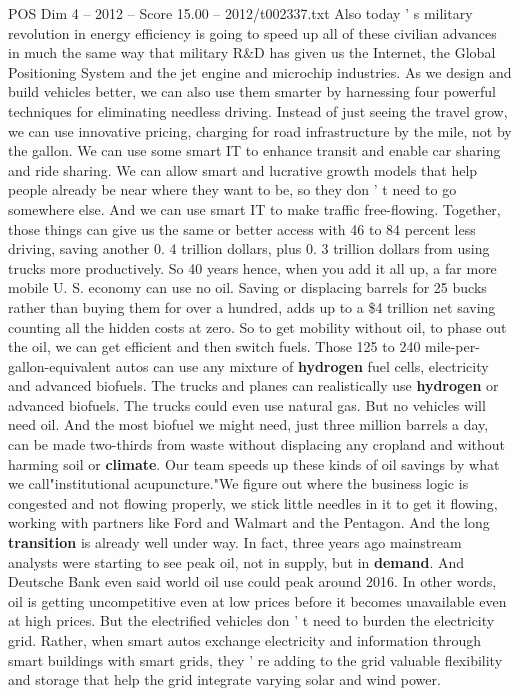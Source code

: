 \begin{textsample}{POS Dim 4 – 2012 – Score 15.00 – 2012/t002337.txt}
Also today ' s military revolution in energy efficiency is going to speed up all of these civilian advances in much the same way that military R\&D has given us the Internet, the Global Positioning System and the jet engine and microchip industries.
As we design and build vehicles better, we can also use them smarter by harnessing four powerful techniques for eliminating needless driving.
Instead of just seeing the travel grow, we can use innovative pricing, charging for road infrastructure by the mile, not by the gallon.
We can use some smart IT to enhance transit and enable car sharing and ride sharing.
We can allow smart and lucrative growth models that help people already be near where they want to be, so they don ' t need to go somewhere else.
And we can use smart IT to make traffic free-flowing.
Together, those things can give us the same or better access with 46 to 84 percent less driving, saving another 0. 4 trillion dollars, plus 0. 3 trillion dollars from using trucks more productively.
So 40 years hence, when you add it all up, a far more mobile U.
S. economy can use no oil.
Saving or displacing barrels for 25 bucks rather than buying them for over a hundred, adds up to a \$4 trillion net saving counting all the hidden costs at zero.
So to get mobility without oil, to phase out the oil, we can get efficient and then switch fuels.
Those 125 to 240 mile-per-gallon-equivalent autos can use any mixture of \textbf{hydrogen} fuel cells, electricity and advanced biofuels.
The trucks and planes can realistically use \textbf{hydrogen} or advanced biofuels.
The trucks could even use natural gas.
But no vehicles will need oil.
And the most biofuel we might need, just three million barrels a day, can be made two-thirds from waste without displacing any cropland and without harming soil or \textbf{climate}.
Our team speeds up these kinds of oil savings by what we call"institutional acupuncture."We figure out where the business logic is congested and not flowing properly, we stick little needles in it to get it flowing, working with partners like Ford and Walmart and the Pentagon.
And the long \textbf{transition} is already well under way.
In fact, three years ago mainstream analysts were starting to see peak oil, not in supply, but in \textbf{demand}.
And Deutsche Bank even said world oil use could peak around 2016.
In other words, oil is getting uncompetitive even at low prices before it becomes unavailable even at high prices.
But the electrified vehicles don ' t need to burden the electricity grid.
Rather, when smart autos exchange electricity and information through smart buildings with smart grids, they ' re adding to the grid valuable flexibility and storage that help the grid integrate varying solar and wind power.

\end{textsample}
